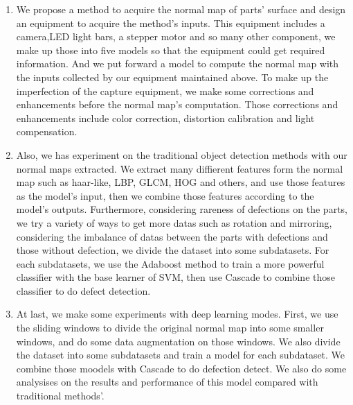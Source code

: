 \begin{englishabstract}
\begin{enumerate}
\item We propose a method to acquire the normal map of parts' surface and  design an equipment to acquire the method's inputs. 
 This equipment includes a camera,LED light bars, a stepper motor and so many other component, 
  we make up those into five models so that the equipment could get required information.
 And we put forward a model to compute the normal map with the inputs collected by our equipment maintained above. To make up the imperfection of the capture equipment, we make some corrections and enhancements before the normal map's computation.
 Those corrections and enhancements include
 color correction, distortion calibration and light compensation.
\item Also, we has experiment on the traditional object detection methods with our normal maps extracted. We extract many diffierent features form the normal map such as haar-like, LBP, GLCM, HOG and others, 
and use those features as the model's input, then we combine those features according to the model's outputs. 
Furthermore, considering rareness of defections on the parts,
we try a variety of ways to get more datas such as rotation and mirroring, considering the imbalance of datas between the parts with defections and those without defection, we divide the dataset into some subdatasets. For each subdatasets, we use the Adaboost method to train a more powerful classifier with the base learner of SVM, then use Cascade to combine those classifier to do defect detection.
\item At last, we make some experiments with deep learning modes. 
First, we use the sliding windows to divide the original normal map into some smaller windows,
and do some data augmentation on those windows. 
We also divide the dataset into some subdatasets and train a model for each subdataset.
We combine those moodels with Cascade to do defection detect.
We also do some analysises on the results and performance of this model compared with traditional methods'.
\end{enumerate}






\end{englishabstract}
